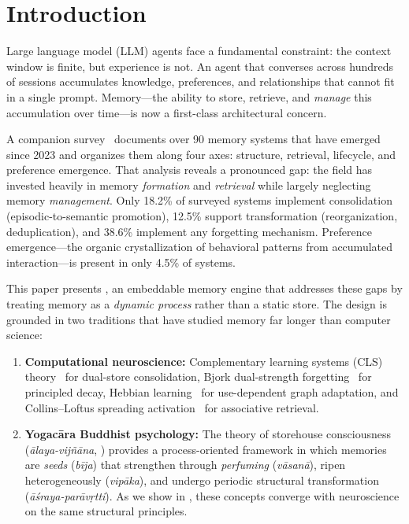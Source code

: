 \section{Introduction}
\label{sec:introduction}

Large language model (LLM) agents face a fundamental constraint: the context
window is finite, but experience is not. An agent that converses across
hundreds of sessions accumulates knowledge, preferences, and relationships
that cannot fit in a single prompt. Memory---the ability to store, retrieve,
and \emph{manage} this accumulation over time---is now a first-class
architectural concern.

A companion survey~\cite{hui2026taxonomy} documents over 90 memory systems
that have emerged since 2023 and organizes them along four axes: structure,
retrieval, lifecycle, and preference emergence. That analysis reveals a
pronounced gap: the field has invested heavily in memory \emph{formation} and
\emph{retrieval} while largely neglecting memory \emph{management}. Only
18.2\% of surveyed systems implement consolidation (episodic-to-semantic
promotion), 12.5\% support transformation (reorganization, deduplication),
and 38.6\% implement any forgetting mechanism. Preference emergence---the
organic crystallization of behavioral patterns from accumulated
interaction---is present in only 4.5\% of systems.

This paper presents \alaya{}, an embeddable memory engine that addresses
these gaps by treating memory as a \emph{dynamic process} rather than a
static store. The design is grounded in two traditions that have studied
memory far longer than computer science:

\begin{enumerate}[leftmargin=*, nosep]
    \item \textbf{Computational neuroscience:} Complementary learning
    systems (CLS) theory~\cite{mcclelland1995} for dual-store consolidation,
    Bjork dual-strength forgetting~\cite{bjork1992} for principled decay,
    Hebbian learning~\cite{hebb1949} for use-dependent graph adaptation, and
    Collins--Loftus spreading activation~\cite{collins1975} for associative
    retrieval.

    \item \textbf{Yogac\=ara Buddhist psychology:} The theory of storehouse
    consciousness (\emph{\=alaya-vij\~n\=ana}, ) provides a
    process-oriented framework in which memories are \emph{seeds}
    (\emph{b\=ija}) that strengthen through \emph{perfuming}
    (\emph{v\=asan\=a}), ripen heterogeneously (\emph{vip\=aka}), and
    undergo periodic structural transformation
    (\emph{\=a\'sraya-par\=av\d{r}tti}). As we show in
    , these concepts converge with neuroscience on
    the same structural principles.
\end{enumerate}

